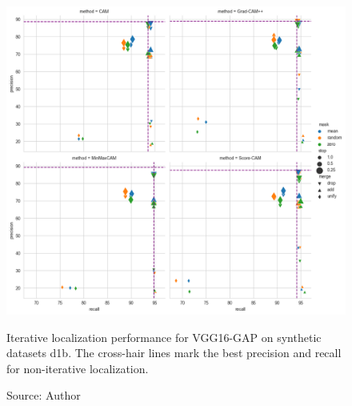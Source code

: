\begin{figure}[ht]
    \begin{center}       
    \includegraphics[width=1.0\textwidth]{images/fig_iter_vgg16_gap_syn_d1b.png}
    \caption[Iterative localization performance for VGG16-GAP on synthetic dataset d1b]{Iterative localization performance for VGG16-GAP on synthetic datasets d1b. The cross-hair lines mark the best precision and recall for non-iterative localization.}
    \caption*{Source: Author}
    \label{fig:prec_iter_vgg16_gap_syn_d1b}
    \end{center}
\end{figure}

